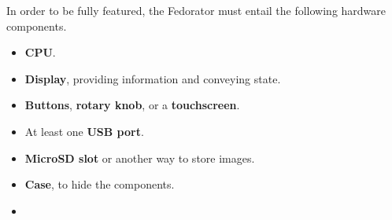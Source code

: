         
        
        In order to be fully featured, the Fedorator must entail the following hardware components.
        \begin{itemize}
            \item \textbf{CPU}.
            \item \textbf{Display}, providing information and conveying state.
            \item \textbf{Buttons}, \textbf{rotary knob}, or a \textbf{touchscreen}.
            \item At least one \textbf{USB port}.
            \item \textbf{MicroSD slot} or another way to store images.
            \item \textbf{Case}, to hide the components.
            \item {}
        \end{itemize}

